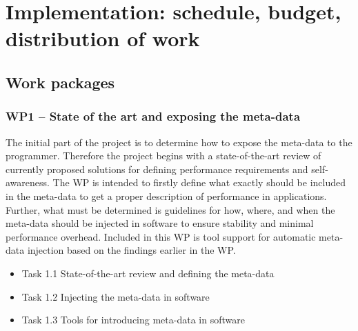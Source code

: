 \documentclass{article}
\begin{document}
\section{Implementation: schedule, budget, distribution of work}
\subsection{Work packages}
\subsubsection{WP1 -- State of the art and exposing the meta-data}
The initial part of the project is to determine how to expose the meta-data to the programmer.
Therefore the project begins with a state-of-the-art review of currently proposed solutions for defining performance requirements and self-awareness.
The WP is intended to firstly define what exactly should be included in the meta-data to get a proper description of performance in applications. 
Further, what must be determined is guidelines for how, where, and when the meta-data should be injected in software to ensure stability and minimal performance overhead.
Included in this WP is tool support for automatic meta-data injection based on the findings earlier in the WP.
\begin{itemize}
 \item Task 1.1 State-of-the-art review and defining the meta-data \vspace{-0.3cm}
 \item Task 1.2 Injecting the meta-data in software \vspace{-0.3cm}
 \item Task 1.3 Tools for introducing meta-data in software \vspace{-0.3cm}
\end{itemize}
\end{document}
